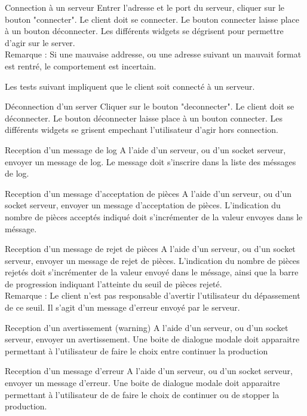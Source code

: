     {Connection à un serveur}
    {Entrer l'adresse et le port du serveur, cliquer sur le bouton "connecter".}
    {Le client doit se connecter.
    Le bouton connecter laisse place à un bouton déconnecter.
    Les différents widgets se dégrisent pour permettre d'agir sur le server.\\
    Remarque : Si une mauvaise addresse, ou une adresse suivant un mauvait format est rentré, le comportement est incertain.}

Les tests suivant impliquent que le client soit connecté à un serveur.

    {Déconnection d'un server}
    {Cliquer sur le bouton "deconnecter".}
    {Le client doit se déconnecter.
    Le bouton déconnecter laisse place à un bouton connecter.
    Les différents widgets se grisent empechant l'utilisateur d'agir hors connection.}

{Reception d'un message de log}
    {A l'aide d'un serveur, ou d'un socket serveur, envoyer un message de log.}
    {Le message doit s'inscrire dans la liste des méssages de log.}

{Reception d'un message d'acceptation de pièces}
    {A l'aide d'un serveur, ou d'un socket serveur, envoyer un message d'acceptation de pièces.}
    {L'indication du nombre de pièces acceptés indiqué doit s'incrémenter de la valeur envoyes dans le méssage.}

{Reception d'un message de rejet de pièces}
    {A l'aide d'un serveur, ou d'un socket serveur, envoyer un message de rejet de pièces.}
    {L'indication du nombre de pièces rejetés doit s'incrémenter de la valeur envoyé dans le méssage, ainsi que la barre de progression indiquant l'atteinte du seuil de pièces rejeté.\\
    Remarque : Le client n'est pas responsable d'avertir l'utilisateur du dépassement de ce seuil. Il s'agit d'un message d'erreur envoyé par le serveur.}

{Reception d'un avertissement (warning)}
    {A l'aide d'un serveur, ou d'un socket serveur, envoyer un avertissement.}
    {Une boite de dialogue modale doit apparaitre permettant à l'utilisateur de faire le choix entre continuer la production}

{Reception d'un message d'erreur}
	{A l'aide d'un serveur, ou d'un socket serveur, envoyer un message d'erreur.}
	{Une boite de dialogue modale doit apparaitre permettant à l'utilisateur de de faire le choix de continuer ou de stopper la production.}

